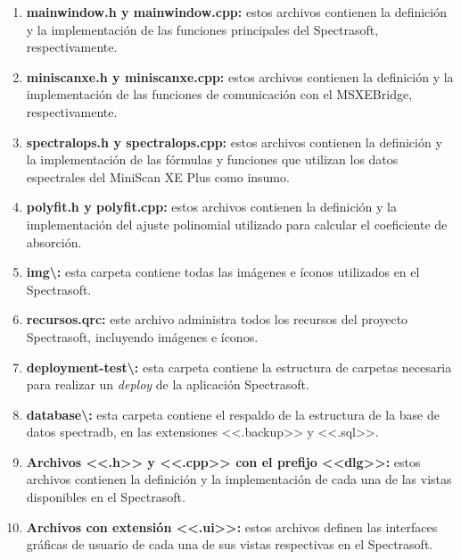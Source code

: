 \begin{enumerate}
	\item \textbf{mainwindow.h y mainwindow.cpp:} estos archivos contienen la definici\'{o}n y la implementaci\'{o}n de las funciones principales del Spectrasoft, respectivamente.
	
	\item \textbf{miniscanxe.h y miniscanxe.cpp:} estos archivos contienen la definici\'{o}n y la implementaci\'{o}n de las funciones de comunicaci\'{o}n con el MSXEBridge, respectivamente.
	
	\item \textbf{spectralops.h y spectralops.cpp:} estos archivos contienen la definici\'{o}n y la implementaci\'{o}n de las f\'{o}rmulas y funciones que utilizan los datos espectrales del MiniScan XE Plus como insumo.
	
	\item \textbf{polyfit.h y polyfit.cpp:} estos archivos contienen la definici\'{o}n y la implementaci\'{o}n del ajuste polinomial utilizado para calcular el coeficiente de absorci\'{o}n.
	
	\item \textbf{img\textbackslash:} esta carpeta contiene todas las im\'{a}genes e \'{i}conos utilizados en el Spectrasoft.
	
	\item \textbf{recursos.qrc:} este archivo administra todos los recursos del proyecto Spectrasoft, incluyendo im\'{a}genes e \'{i}conos.
	
	\item \textbf{deployment-test\textbackslash:} esta carpeta contiene la estructura de carpetas necesaria para realizar un \textit{deploy} de la aplicaci\'{o}n Spectrasoft.
	
	\item \textbf{database\textbackslash:} esta carpeta contiene el respaldo de la estructura de la base de datos spectradb, en las extensiones <<.backup>> y <<.sql>>.
	
	\item \textbf{Archivos <<.h>> y <<.cpp>> con el prefijo <<dlg>>:} estos archivos contienen la definici\'{o}n y la implementaci\'{o}n de cada una de las vistas disponibles en el Spectrasoft.
	
	\item \textbf{Archivos con extensi\'{o}n <<.ui>>:} estos archivos definen las interfaces gr\'{a}ficas de usuario de cada una de sus vistas respectivas en el Spectrasoft.
\end{enumerate}


